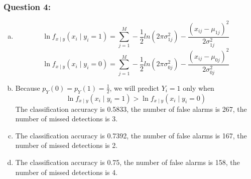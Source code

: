 \documentclass[12pt]{article}
\begin{document}
\subsubsection*{Question 4:} 
\begin{enumerate}[a)]
  \item 
  \begin{equation*}
  \ln{f{_{x\mid y}(x_i\mid y_i=1)}} = \sum\limits_{j=1}^{M}-\dfrac{1}{2}ln{(2\pi \sigma_{1j}^2)} - \dfrac{(x_{ij}-\mu_{1j})^2}{2\sigma_{1j}^2}
  \end{equation*}
  \begin{equation*}
  \ln{f{_{x\mid y}(x_i\mid y_i=0)}} = \sum\limits_{j=1}^{M}-\dfrac{1}{2}ln{(2\pi \sigma_{0j}^2)} - \dfrac{(x_{ij}-\mu_{0j})^2}{2\sigma_{0j}^2}
  \end{equation*}
     
  \item 
  Because $p_Y(0)=p_Y(1)=\frac{1}{2}$, we will predict $Y_i=1$ only when
  \begin{equation*}
  \ln{f{_{x\mid y}(x_i\mid y_i=1)}} > \ln{f{_{x\mid y}(x_i\mid y_i=0)}}
  \end{equation*}
  The classification accuracy is 0.5833, the number of false alarms is 267, the number of missed detections is 3. 
  \item 
  The classification accuracy is 0.7392, the number of false alarms is 167, the number of missed detections is 2. 
  
  \item 
  The classification accuracy is 0.75, the number of false alarms is 158, the number of missed detections is 4. 
  



\end{enumerate}
  
  
\end{document}
